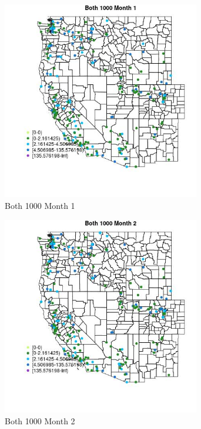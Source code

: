 \begin{figure} 
\centering  
\includegraphics[width=0.77\textwidth]{Code_Outputs/Report_ML_input_PM25_Step4_part_e_de_duplicated_aveswNAs_MapObsMo1Both_1000.jpg} 
\caption{\label{fig:Report_ML_input_PM25_Step4_part_e_de_duplicated_aveswNAsMapObsMo1Both_1000}Both 1000 Month 1} 
\end{figure} 
 

\begin{figure} 
\centering  
\includegraphics[width=0.77\textwidth]{Code_Outputs/Report_ML_input_PM25_Step4_part_e_de_duplicated_aveswNAs_MapObsMo2Both_1000.jpg} 
\caption{\label{fig:Report_ML_input_PM25_Step4_part_e_de_duplicated_aveswNAsMapObsMo2Both_1000}Both 1000 Month 2} 
\end{figure} 
 

